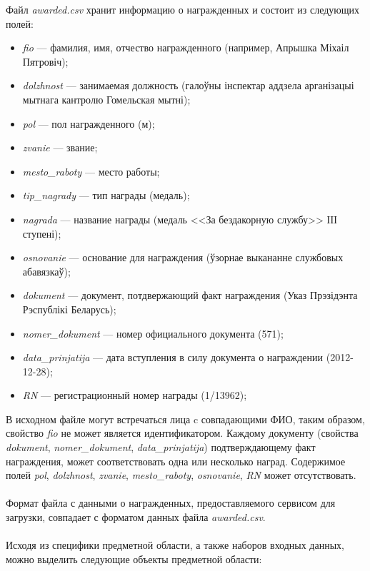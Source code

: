 Файл \textit{awarded.csv} хранит информацию о награжденных и состоит из следующих полей:
\begin{itemize}
\item
  \textit{fio} --- фамилия, имя, отчество награжденного
  (например, Апрышка Міхаіл Пятровіч);
\item
  \textit{dolzhnost} --- занимаемая должность
  (галоўны інспектар аддзела арганізацыі мытнага кантролю Гомельская мытні);
\item
  \textit{pol} --- пол награжденного (м);
\item
  \textit{zvanie} --- звание;
\item
  \textit{mesto\_raboty} --- место работы;
\item 
  \textit{tip\_nagrady} --- тип награды (медаль);
\item
  \textit{nagrada} --- название награды
  (медаль <<За бездакорную службу>> ІIІ ступені);
\item
  \textit{osnovanie} --- основание для награждения
  (ўзорнае выкананне службовых абавязкаў);
\item
  \textit{dokument} --- документ, потдвержающий факт награждения
  (Указ Прэзідэнта Рэспублікі Беларусь);
\item
  \textit{nomer\_dokument} --- номер официального документа
  (571);
\item
  \textit{data\_prinjatija} --- дата вступления в силу документа о награждении
  (2012-12-28);
\item
  \textit{RN} --- регистрационный номер награды (1/13962);
\end{itemize}

В исходном файле могут встречаться лица c совпадающими ФИО,
таким образом, свойство \textit{fio} не может является идентификатором.
Каждому документу (свойства \textit{dokument}, \textit{nomer\_dokument},
\textit{data\_prinjatija})
подтверждающему факт награждения, может соответствовать одна или несколько наград.
Содержимое полей \textit{pol}, \textit{dolzhnost}, \textit{zvanie}, 
\textit{mesto\_raboty}, \textit{osnovanie}, \textit{RN} может отсутствовать.

\paragraph{}
Формат файла с данными о награжденных, предоставляемого сервисом для загрузки,
совпадает с форматом данных файла \textit{awarded.csv}.

\paragraph{}
Исходя из специфики предметной области, а также наборов входных данных,
можно выделить следующие объекты предметной области:

